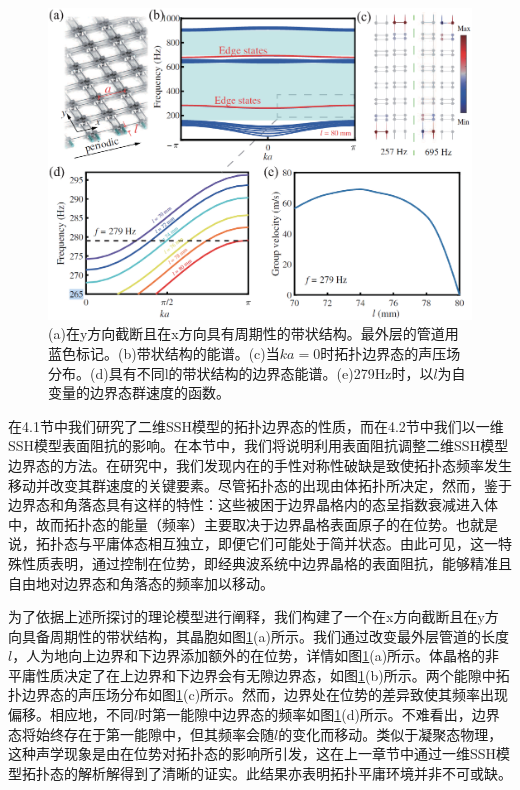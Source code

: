 \begin{figure}[h!]
    \centering
    \includegraphics[width=1\textwidth]{images/fig4-6.eps} 
    \caption{(a)在y方向截断且在x方向具有周期性的带状结构。最外层的管道用蓝色标记。(b)带状结构的能谱。(c)当$ka = 0$时拓扑边界态的声压场分布。(d)具有不同l的带状结构的边界态能谱。(e)279Hz时，以$l$为自变量的边界态群速度的函数。}
    \label{fig_4_6}
\end{figure} 

在4.1节中我们研究了二维SSH模型的拓扑边界态的性质，而在4.2节中我们以一维SSH模型表面阻抗的影响。在本节中，我们将说明利用表面阻抗调整二维SSH模型边界态的方法。在研究中，我们发现内在的手性对称性破缺是致使拓扑态频率发生移动并改变其群速度的关键要素。尽管拓扑态的出现由体拓扑所决定，然而，鉴于边界态和角落态具有这样的特性：这些被困于边界晶格内的态呈指数衰减进入体中，故而拓扑态的能量（频率）主要取决于边界晶格表面原子的在位势。也就是说，拓扑态与平庸体态相互独立，即便它们可能处于简并状态。由此可见，这一特殊性质表明，通过控制在位势，即经典波系统中边界晶格的表面阻抗，能够精准且自由地对边界态和角落态的频率加以移动。

为了依据上述所探讨的理论模型进行阐释，我们构建了一个在x方向截断且在y方向具备周期性的带状结构，其晶胞如图\ref{fig_4_6}(a)所示。我们通过改变最外层管道的长度$l$，人为地向上边界和下边界添加额外的在位势，详情如图\ref{fig_4_6}(a)所示。体晶格的非平庸性质决定了在上边界和下边界会有无隙边界态，如图\ref{fig_4_6}(b)所示。两个能隙中拓扑边界态的声压场分布如图\ref{fig_4_6}(c)所示。然而，边界处在位势的差异致使其频率出现偏移。相应地，不同$l$时第一能隙中边界态的频率如图\ref{fig_4_6}(d)所示。不难看出，边界态将始终存在于第一能隙中，但其频率会随$l$的变化而移动。类似于凝聚态物理，这种声学现象是由在位势对拓扑态的影响所引发，这在上一章节中通过一维SSH模型拓扑态的解析解得到了清晰的证实。此结果亦表明拓扑平庸环境并非不可或缺。

